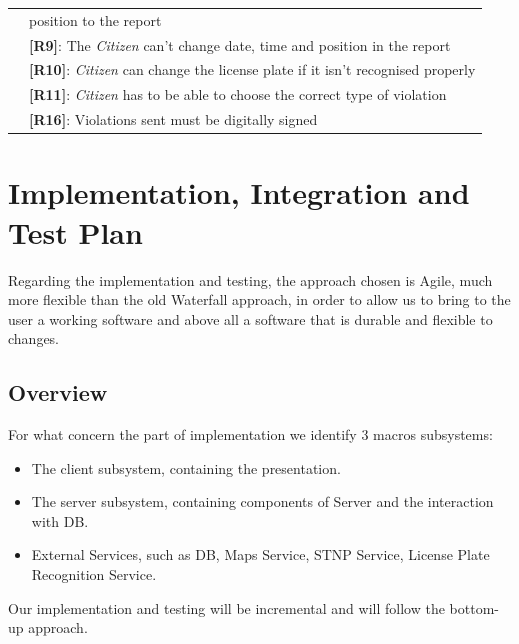 \documentclass{article}
\begin{document}
\begin{center}
\begin{tabular}{ | l | l |}
                        & position to the report \\
                        & \textbf{[R9]}: The \textit{Citizen} can’t change date, time and position in the report \\ 
                        & \textbf{[R10]}: \textit{Citizen} can change the license plate if it isn’t recognised properly \\
                        & \textbf{[R11]}: \textit{Citizen} has to be able to choose the correct type of violation \\
                        & \textbf{[R16]}: Violations sent must be digitally signed \\
        \hline
    \end{tabular}
    \end{center}
\clearpage
\section{Implementation, Integration and Test Plan}
Regarding the implementation and testing, the approach chosen is Agile, much more flexible 
than the old Waterfall approach, in order to allow us to bring to the user a working software 
and above all a software that is durable and flexible to changes.

\subsection{Overview}
For what concern the part of implementation we identify 3 macros subsystems:
\begin{itemize}
    \item The client subsystem, containing the presentation.
    \item The server subsystem, containing components of Server and the interaction with DB.
    \item External Services, such as DB, Maps Service, STNP Service, License Plate Recognition Service. 
\end{itemize}  
Our implementation and testing will be incremental and will follow the bottom-up approach.
\end{document}
